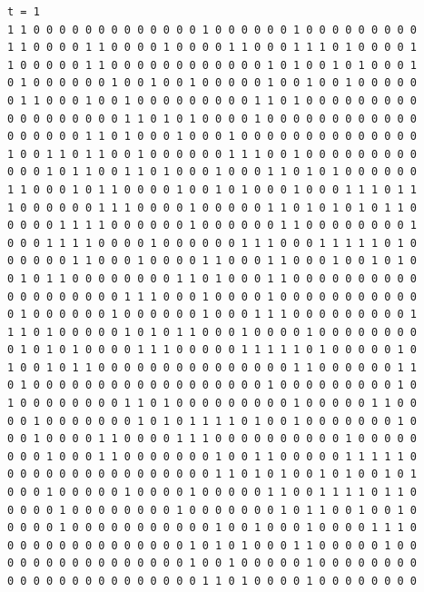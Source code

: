 \documentclass[a4paper,12pt]{article}
\begin{document}
\begin{verbatim}
t = 1
1 1 0 0 0 0 0 0 0 0 0 0 0 0 0 1 0 0 0 0 0 0 1 0 0 0 0 0 0 0 0 0 
1 1 0 0 0 0 1 1 0 0 0 0 1 0 0 0 0 1 1 0 0 0 1 1 1 0 1 0 0 0 0 1 
1 0 0 0 0 0 1 1 0 0 0 0 0 0 0 0 0 0 0 0 1 0 1 0 0 1 0 1 0 0 0 1 
0 1 0 0 0 0 0 0 1 0 0 1 0 0 1 0 0 0 0 0 1 0 0 1 0 0 1 0 0 0 0 0 
0 1 1 0 0 0 1 0 0 1 0 0 0 0 0 0 0 0 0 1 1 0 1 0 0 0 0 0 0 0 0 0 
0 0 0 0 0 0 0 0 0 1 1 0 1 0 1 0 0 0 0 1 0 0 0 0 0 0 0 0 0 0 0 0 
0 0 0 0 0 0 1 1 0 1 0 0 0 1 0 0 0 1 0 0 0 0 0 0 0 0 0 0 0 0 0 0 
1 0 0 1 1 0 1 1 0 0 1 0 0 0 0 0 0 1 1 1 0 0 1 0 0 0 0 0 0 0 0 0 
0 0 0 1 0 1 1 0 0 1 1 0 1 0 0 0 1 0 0 0 1 1 0 1 0 1 0 0 0 0 0 0 
1 1 0 0 0 1 0 1 1 0 0 0 0 1 0 0 1 0 1 0 0 0 1 0 0 0 1 1 1 0 1 1 
1 0 0 0 0 0 0 1 1 1 0 0 0 0 1 0 0 0 0 0 1 1 0 1 0 1 0 1 0 1 1 0 
0 0 0 0 1 1 1 1 0 0 0 0 0 0 1 0 0 0 0 0 0 1 1 0 0 0 0 0 0 0 0 1 
0 0 0 1 1 1 1 0 0 0 0 1 0 0 0 0 0 0 1 1 1 0 0 0 1 1 1 1 1 0 1 0 
0 0 0 0 0 1 1 0 0 0 1 0 0 0 0 1 1 0 0 0 1 1 0 0 0 1 0 0 1 0 1 0 
0 1 0 1 1 0 0 0 0 0 0 0 0 1 1 0 1 0 0 0 1 1 0 0 0 0 0 0 0 0 0 0 
0 0 0 0 0 0 0 0 0 1 1 1 0 0 0 1 0 0 0 0 1 0 0 0 0 0 0 0 0 0 0 0 
0 1 0 0 0 0 0 0 1 0 0 0 0 0 0 1 0 0 0 1 1 1 0 0 0 0 0 0 0 0 0 1 
1 1 0 1 0 0 0 0 0 1 0 1 0 1 1 0 0 0 1 0 0 0 0 1 0 0 0 0 0 0 0 0 
0 1 0 1 0 1 0 0 0 0 1 1 1 0 0 0 0 0 1 1 1 1 1 0 1 0 0 0 0 0 1 0 
1 0 0 1 0 1 1 0 0 0 0 0 0 0 0 0 0 0 0 0 0 0 1 1 0 0 0 0 0 0 1 1 
0 1 0 0 0 0 0 0 0 0 0 0 0 0 0 0 0 0 0 0 1 0 0 0 0 0 0 0 0 0 1 0 
1 0 0 0 0 0 0 0 0 1 1 0 1 0 0 0 0 0 0 0 0 0 1 0 0 0 0 0 1 1 0 0 
0 0 1 0 0 0 0 0 0 0 1 0 1 0 1 1 1 1 0 1 0 0 1 0 0 0 0 0 0 0 1 0 
0 0 1 0 0 0 0 1 1 0 0 0 0 1 1 1 0 0 0 0 0 0 0 0 0 0 1 0 0 0 0 0 
0 0 0 1 0 0 0 1 1 0 0 0 0 0 0 0 1 0 0 1 1 0 0 0 0 0 1 1 1 1 1 0 
0 0 0 0 0 0 0 0 0 0 0 0 0 0 0 0 1 1 0 1 0 1 0 0 1 0 1 0 0 1 0 1 
0 0 0 1 0 0 0 0 0 1 0 0 0 0 1 0 0 0 0 0 1 1 0 0 1 1 1 1 0 1 1 0 
0 0 0 0 1 0 0 0 0 0 0 0 0 1 0 0 0 0 0 0 0 1 0 1 1 0 0 1 0 0 1 0 
0 0 0 0 1 0 0 0 0 0 0 0 0 0 0 0 1 0 0 1 0 0 0 1 0 0 0 0 1 1 1 0 
0 0 0 0 0 0 0 0 0 0 0 0 0 0 1 0 1 0 1 0 0 0 1 1 0 0 0 0 0 1 0 0 
0 0 0 0 0 0 0 0 0 0 0 0 0 0 1 0 0 1 0 0 0 0 0 1 0 0 0 0 0 0 0 0 
0 0 0 0 0 0 0 0 0 0 0 0 0 0 0 1 1 0 1 0 0 0 0 1 0 0 0 0 0 0 0 0 




\end{verbatim}
\end{document}
